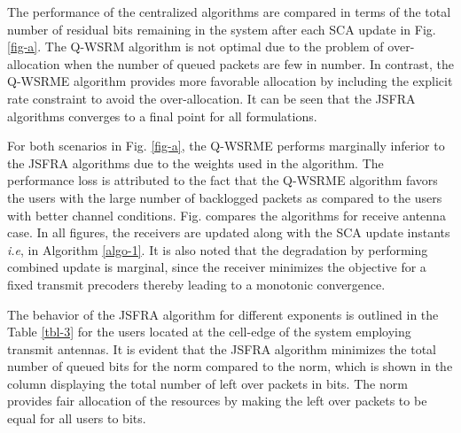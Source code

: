 The performance of the centralized algorithms are compared in terms of the total number of residual bits remaining in the system after each \ac{SCA} update in Fig. \ref{fig-a}. The \ac{Q-WSRM} algorithm is not optimal due to the problem of over-allocation when the number of queued packets are few in number. In contrast, the \ac{Q-WSRME} algorithm provides more favorable allocation by including the explicit rate constraint to avoid the over-allocation. It can be seen that the \ac{JSFRA} algorithms converges to a final point for all formulations. 

For both scenarios in Fig. \ref{fig-a}, the \ac{Q-WSRME} performs marginally inferior to the \ac{JSFRA} algorithms due to the weights used in the algorithm. The performance loss is  attributed to the fact that the \ac{Q-WSRME} algorithm favors the users with the large number of backlogged packets as compared to the users with better channel conditions. Fig.  compares the algorithms for  receive antenna case. In all figures, the receivers are updated along with the \ac{SCA} update instants \textit{i.e},  in Algorithm \ref{algo-1}. It is also noted that the degradation by performing combined update is marginal, since the receiver minimizes the objective for a fixed transmit precoders thereby leading to a monotonic convergence.

The behavior of the \ac{JSFRA} algorithm for different exponents  is outlined in the Table \ref{tbl-3} for the users located at the cell-edge of the system employing  transmit antennas. It is evident that the \ac{JSFRA} algorithm minimizes the total number of queued bits for the  norm compared to the  norm, which is shown in the column displaying the total number of left over packets \me{\chi} in bits. The \me{\ell_{\infty}} norm provides fair allocation of the resources by making the left over packets to be equal for all users to  bits.
